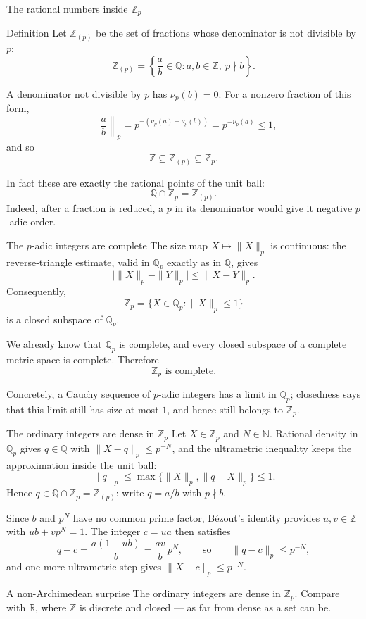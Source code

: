 \documentclass[aspectratio=169,11pt]{beamer}
\newcommand{\N}{\mathbb N}
\newcommand{\Z}{\mathbb Z}
\newcommand{\Q}{\mathbb Q}
\newcommand{\R}{\mathbb R}
\begin{document}
\begin{frame}{The rational numbers inside \(\Z_p\)}
  \small
  \begin{block}{Definition}
    Let \(\Z_{(p)}\) be the set of fractions whose denominator is not
    divisible by \(p\):
    \[
      \Z_{(p)}
        =\left\{\frac ab\in\Q:a,b\in\Z,\ p\nmid b\right\}.
    \]
  \end{block}
  A denominator not divisible by \(p\) has \(\nu_p(b)=0\).  For a nonzero
  fraction of this form,
  \[
    \left\|\frac ab\right\|_p
      =p^{-(\nu_p(a)-\nu_p(b))}
      =p^{-\nu_p(a)}\le1,
  \]
  and so
  \[
    \boxed{\Z\subseteq\Z_{(p)}\subseteq\Z_p.}
  \]

  In fact these are exactly the rational points of the unit ball:
  \[
    \boxed{\Q\cap\Z_p=\Z_{(p)}.}
  \]
  Indeed, after a fraction is reduced, a \(p\) in its denominator would
  give it negative \(p\)-adic order.
\end{frame}

\begin{frame}{The \(p\)-adic integers are complete}
  The size map \(X\mapsto\|X\|_p\) is continuous: the reverse-triangle
  estimate, valid in \(\Q_p\) exactly as in \(\Q\), gives
  \[
    \bigl|\|X\|_p-\|Y\|_p\bigr|\le\|X-Y\|_p.
  \]
  Consequently,
  \[
    \Z_p=\{X\in\Q_p:\|X\|_p\le1\}
  \]
  is a closed subspace of \(\Q_p\).

  We already know that \(\Q_p\) is complete, and every closed subspace of a
  complete metric space is complete.  Therefore
  \[
    \boxed{\Z_p\text{ is complete.}}
  \]

  Concretely, a Cauchy sequence of \(p\)-adic integers has a limit in
  \(\Q_p\); closedness says that this limit still has size at most \(1\),
  and hence still belongs to \(\Z_p\).
\end{frame}

\begin{frame}{The ordinary integers are dense in \(\Z_p\)}
  \small
  Let \(X\in\Z_p\) and \(N\in\N\).  Rational density in \(\Q_p\) gives
  \(q\in\Q\) with \(\|X-q\|_p\le p^{-N}\), and the ultrametric inequality
  keeps the approximation inside the unit ball:
  \[
    \|q\|_p\le\max\{\|X\|_p,\|q-X\|_p\}\le1.
  \]
  Hence \(q\in\Q\cap\Z_p=\Z_{(p)}\): write \(q=a/b\) with \(p\nmid b\).

  Since \(b\) and \(p^N\) have no common prime factor, Bézout's identity
  provides \(u,v\in\Z\) with \(ub+vp^N=1\).  The integer \(c=ua\) then
  satisfies
  \[
    q-c=\frac{a(1-ub)}{b}=\frac{av}{b}\,p^N,
    \qquad\text{so}\qquad
    \|q-c\|_p\le p^{-N},
  \]
  and one more ultrametric step gives \(\|X-c\|_p\le p^{-N}\).

  \begin{alertblock}{A non-Archimedean surprise}
    The ordinary integers are dense in \(\Z_p\).  Compare with \(\R\),
    where \(\Z\) is discrete and closed --- as far from dense as a set
    can be.
  \end{alertblock}
\end{frame}
\end{document}
